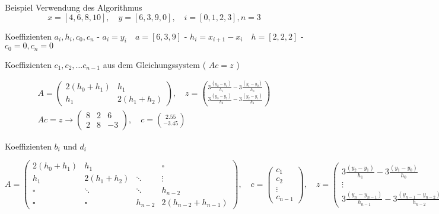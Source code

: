 \begin{example2}{Beispiel Verwendung des Algorithmus}
    $$
    x=[4,6,8,10], \quad y=[6,3,9,0], \quad i=[0,1,2,3], n=3
    $$


    Koeffizienten $a_i, h_i, c_0, c_n$
    - $a_i=y_i \quad a=[6,3,9]$
    - $h_i=x_{i+1}-x_i \quad h=[2,2,2]$
    - $c_0=0, c_n=0$

    Koeffizienten $c_1, c_2, \ldots c_{n-1}$ aus dem Gleichungssystem ( $A c=z$ )

    $$
    \begin{gathered}
    A=\left(\begin{array}{cc}
    2\left(h_0+h_1\right) & h_1 \\
    h_1 & 2\left(h_1+h_2\right)
    \end{array}\right), \quad z=\binom{3 \frac{\left(y_2-y_1\right)}{h_1}-3 \frac{\left(y_1-y_0\right)}{h_0}}{3 \frac{\left(y_3-y_2\right)}{h_2}-3 \frac{\left(y_2-y_1\right)}{h_1}} \\
    A c=z \rightarrow\left(\begin{array}{ll|c}
    8 & 2 & 6 \\
    2 & 8 & -3
    \end{array}\right), \quad c=\binom{2.55}{-3.45}
    \end{gathered}
    $$


    Koeffizienten $b_i$ und $d_i$

    \tcblower

    $$
    A=\left(\begin{array}{cccc}
    2\left(h_0+h_1\right) & h_1 & & \square \\
    h_1 & 2\left(h_1+h_2\right) & \ddots & \vdots \\
    \square & \ddots & \ddots & h_{n-2} \\
    \square & \square & h_{n-2} & 2\left(h_{n-2}+h_{n-1}\right)
    \end{array}\right), \quad c=\left(\begin{array}{c}
    c_1 \\
    c_2 \\
    \vdots \\
    c_{n-1}
    \end{array}\right), \quad z=\left(\begin{array}{c}
    3 \frac{\left(y_2-y_1\right)}{h_1}-3 \frac{\left(y_1-y_0\right)}{h_0} \\
    \vdots \\
    3 \frac{\left(y_n-y_{n-1}\right)}{h_{n-1}}-3 \frac{\left(y_{n-1}-y_{n-2}\right)}{h_{n-2}}
    \end{array}\right)
    $$
\end{example2}
